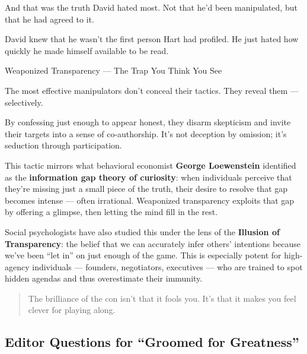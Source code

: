 And that was the truth David hated most.
Not that he’d been manipulated, but that he had agreed to it.

David knew that he wasn’t the first person Hart had profiled.
He just hated how quickly he made himself available to be read.

\medskip

\begin{PsychologicalSidebar}{Weaponized Transparency — The Trap You Think You See}

    The most effective manipulators don’t conceal their tactics. They reveal them — selectively.

    
    \medskip
    
    By confessing just enough to appear honest, they disarm skepticism and invite their targets into a sense of 
    co-authorship. It’s not deception by omission; it’s seduction through participation.

    
    \medskip
    
    This tactic mirrors what behavioral economist \textbf{George Loewenstein} identified as the 
    \textbf{information gap theory of curiosity}: when individuals perceive that they’re missing 
    just a small piece of the truth, their desire to resolve that gap becomes intense — often irrational. 
    Weaponized transparency exploits that gap by offering a glimpse, then letting the mind fill in the rest.
    
    \medskip
    
    Social psychologists have also studied this under the lens of the \textbf{Illusion of Transparency}: 
    the belief that we can accurately infer others’ intentions because we've been “let in” on just enough of the game.  
    This is especially potent for high-agency individuals — founders, negotiators, executives — who are trained to 
    spot hidden agendas and thus overestimate their immunity.
    
    \begin{quote}
    The brilliance of the con isn't that it fools you.  
    It's that it makes you feel clever for playing along.
    \end{quote}
    
\end{PsychologicalSidebar}
    

\subsection*{Editor Questions for ``Groomed for Greatness''}

